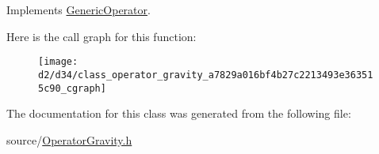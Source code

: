 Implements \hyperlink{class_generic_operator_aacd69e70a1e2d75b97358fca48689a67}{Generic\+Operator}.



Here is the call graph for this function\+:\nopagebreak
\begin{figure}[H]
\begin{center}
\leavevmode
\texttt{[image: d2/d34/class\_operator\_gravity\_a7829a016bf4b27c2213493e363515c90\_cgraph]}
\end{center}
\end{figure}




The documentation for this class was generated from the following file\+:\begin{DoxyCompactItemize}
\item 
source/\hyperlink{_operator_gravity_8h}{Operator\+Gravity.\+h}\end{DoxyCompactItemize}
